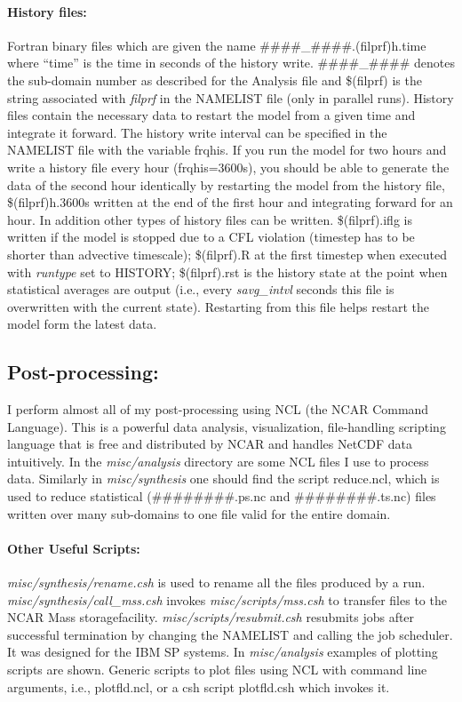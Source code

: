 \documentclass[11pt,a4paper]{article}
\begin{document}
\paragraph{History files:}

Fortran binary files which are given the name
\#\#\#\#\_\#\#\#\#.(filprf)h.time where ``time'' is the time in seconds
of the history write. \#\#\#\#\_\#\#\#\# denotes the sub-domain number
as described for the Analysis file and \$(filprf) is the string associated
with \emph{filprf} in the NAMELIST file (only in parallel runs).
History files contain the necessary data to restart the model from
a given time and integrate it forward. The history write interval
can be specified in the NAMELIST file with the variable frqhis.
If you run the model for two hours and write a history file every
hour (frqhis=3600s), you should be able to generate the data of
the second hour identically by restarting the model from the
history file, \$(filprf)h.3600s written at the end of the first
hour and integrating forward for an hour.
In addition other types of history files can be written.
\$(filprf).iflg is written if the model is stopped due to a CFL
violation (timestep has to be shorter than advective timescale);
\$(filprf).R at the first timestep when executed with \emph{runtype}
set to HISTORY; \$(filprf).rst is the history state at the point when
statistical averages are output (i.e., every \emph{savg\_intvl} seconds
this file is overwritten with the current state). Restarting from this
file helps restart the model form the latest data.

\subsection{Post-processing:}

I perform almost all of my post-processing using NCL (the NCAR Command
Language). This is a powerful data analysis, visualization,
file-handling scripting language that is free and distributed by NCAR
and handles NetCDF data intuitively.  In the \emph{misc/analysis}
directory are some NCL files I use to process data.  Similarly in
\emph{misc/synthesis} one should find the script reduce.ncl, which is
used to reduce statistical (\#\#\#\#\#\#\#\#.ps.nc and \#\#\#\#\#\#\#\#.ts.nc)
files written over many sub-domains to one file valid for the entire domain.

\paragraph{Other Useful Scripts:} \emph{misc/synthesis/rename.csh} 
is used to rename all the files produced by a run. 
\emph{misc/synthesis/call\_mss.csh} invokes \emph{misc/scripts/mss.csh} 
to transfer files to the NCAR Mass storagefacility.  
\emph{misc/scripts/resubmit.csh} resubmits jobs after
successful termination by changing the NAMELIST and calling the job
scheduler. It was designed for the IBM SP systems. In
\emph{misc/analysis} examples of plotting scripts are shown.
Generic scripts to plot files using NCL with command line arguments, i.e.,
plotfld.ncl, or a csh script plotfld.csh which invokes it.
\end{document}
